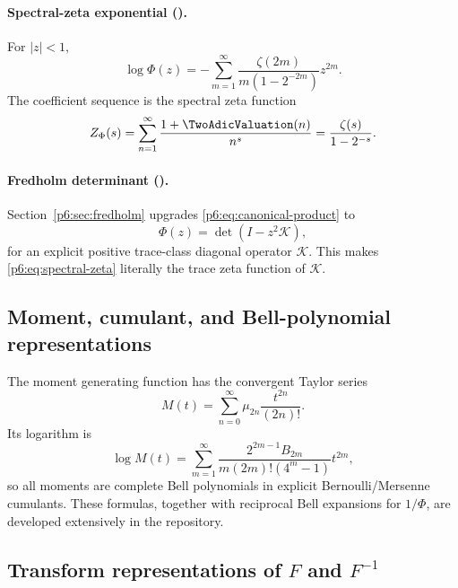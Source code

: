 \documentclass[11pt]{article}
\theoremstyle{definition}
\theoremstyle{remark}
\newcommand{\cK}{\mathcal K}
\begin{document}
\paragraph{Spectral-zeta exponential (\statusknownPartl).}
For \(|z|<1\),
\begin{equation}
 \log\Phi(z)
 =-\sum_{m=1}^{\infty}
 \frac{\zeta(2m)}{m(1-2^{-2m})}z^{2m}.                       \label{p6:eq:logPhi-zeta}
\end{equation}
The coefficient sequence is the spectral zeta function
\begin{equation}
 Z_{\Phi}(s)=\sum_{n=1}^{\infty}\frac{1+\TwoAdicValuation(n)}{n^s}
 =\frac{\zeta(s)}{1-2^{-s}}.                                \label{p6:eq:spectral-zeta}
\end{equation}

\paragraph{Fredholm determinant (\statusnewPartl).}
Section~\ref{p6:sec:fredholm} upgrades \eqref{p6:eq:canonical-product} to
\begin{equation}
 \Phi(z)=\det(I-z^2\cK),                                    \label{p6:eq:fredholm-preview}
\end{equation}
for an explicit positive trace-class diagonal operator \(\cK\).  This makes
\eqref{p6:eq:spectral-zeta} literally the trace zeta function of \(\cK\).

\subsection{Moment, cumulant, and Bell-polynomial representations}

The moment generating function has the convergent Taylor series
\begin{equation}
 M(t)=\sum_{n=0}^{\infty}\mu_{2n}\frac{t^{2n}}{(2n)!}.       \label{p6:eq:M-moment-series}
\end{equation}
Its logarithm is
\begin{equation}
 \log M(t)=
 \sum_{m=1}^{\infty}
 \frac{2^{2m-1}B_{2m}}{m(2m)!(4^m-1)}t^{2m},                \label{p6:eq:M-cumulant}
\end{equation}
so all moments are complete Bell polynomials in explicit Bernoulli/Mersenne cumulants.
These formulas, together with reciprocal Bell expansions for \(1/\Phi\), are developed
extensively in the repository.

\subsection[Transform representations of F and inverse F]{Transform representations of \(F\) and \(F^{-1}\)}
\end{document}
